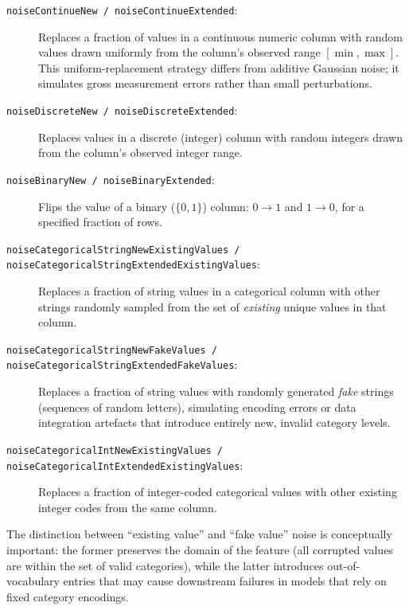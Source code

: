 \begin{description}
    \item[\texttt{noiseContinueNew / noiseContinueExtended}:]
        Replaces a fraction of values in a continuous numeric column with
        random values drawn uniformly from the column's observed range
        $[\min, \max]$.  This uniform-replacement strategy differs from
        additive Gaussian noise; it simulates gross measurement errors rather
        than small perturbations.

    \item[\texttt{noiseDiscreteNew / noiseDiscreteExtended}:]
        Replaces values in a discrete (integer) column with random integers
        drawn from the column's observed integer range.

    \item[\texttt{noiseBinaryNew / noiseBinaryExtended}:]
        Flips the value of a binary ($\{0, 1\}$) column: $0 \to 1$ and
        $1 \to 0$, for a specified fraction of rows.

    \item[\texttt{noiseCategoricalStringNewExistingValues /}]
    \item[\texttt{noiseCategoricalStringExtendedExistingValues}:]
        Replaces a fraction of string values in a categorical column with
        other strings randomly sampled from the set of \emph{existing} unique
        values in that column.

    \item[\texttt{noiseCategoricalStringNewFakeValues /}]
    \item[\texttt{noiseCategoricalStringExtendedFakeValues}:]
        Replaces a fraction of string values with randomly generated
        \emph{fake} strings (sequences of random letters), simulating encoding
        errors or data integration artefacts that introduce entirely new,
        invalid category levels.

    \item[\texttt{noiseCategoricalIntNewExistingValues /}]
    \item[\texttt{noiseCategoricalIntExtendedExistingValues}:]
        Replaces a fraction of integer-coded categorical values with other
        existing integer codes from the same column.
\end{description}

The distinction between ``existing value'' and ``fake value'' noise is
conceptually important: the former preserves the domain of the feature (all
corrupted values are within the set of valid categories), while the latter
introduces out-of-vocabulary entries that may cause downstream failures in
models that rely on fixed category encodings.

